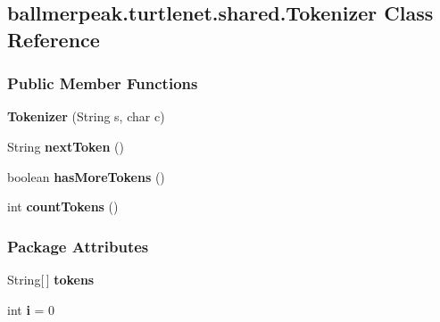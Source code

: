 \hypertarget{classballmerpeak_1_1turtlenet_1_1shared_1_1Tokenizer}{\subsection{ballmerpeak.\-turtlenet.\-shared.\-Tokenizer Class Reference}
\label{classballmerpeak_1_1turtlenet_1_1shared_1_1Tokenizer}
}
\subsubsection*{Public Member Functions}
\begin{DoxyCompactItemize}
\item 
\hypertarget{classballmerpeak_1_1turtlenet_1_1shared_1_1Tokenizer_a5aabdd62ed478d9d0693741b000aed81}{{\bfseries Tokenizer} (String s, char c)}\label{classballmerpeak_1_1turtlenet_1_1shared_1_1Tokenizer_a5aabdd62ed478d9d0693741b000aed81}

\item 
\hypertarget{classballmerpeak_1_1turtlenet_1_1shared_1_1Tokenizer_aaa2e2f9a3abb9557ab3e11e7f7103c3d}{String {\bfseries next\-Token} ()}\label{classballmerpeak_1_1turtlenet_1_1shared_1_1Tokenizer_aaa2e2f9a3abb9557ab3e11e7f7103c3d}

\item 
\hypertarget{classballmerpeak_1_1turtlenet_1_1shared_1_1Tokenizer_a4a3ca279fc748a7afcd37fd50bc533d4}{boolean {\bfseries has\-More\-Tokens} ()}\label{classballmerpeak_1_1turtlenet_1_1shared_1_1Tokenizer_a4a3ca279fc748a7afcd37fd50bc533d4}

\item 
\hypertarget{classballmerpeak_1_1turtlenet_1_1shared_1_1Tokenizer_a9e57ee02e894bf1291ae702ecc0fa11f}{int {\bfseries count\-Tokens} ()}\label{classballmerpeak_1_1turtlenet_1_1shared_1_1Tokenizer_a9e57ee02e894bf1291ae702ecc0fa11f}

\end{DoxyCompactItemize}
\subsubsection*{Package Attributes}
\begin{DoxyCompactItemize}
\item 
\hypertarget{classballmerpeak_1_1turtlenet_1_1shared_1_1Tokenizer_a776a32b36d0990c7008b7ae2084ff178}{String\mbox{[}$\,$\mbox{]} {\bfseries tokens}}\label{classballmerpeak_1_1turtlenet_1_1shared_1_1Tokenizer_a776a32b36d0990c7008b7ae2084ff178}

\item 
\hypertarget{classballmerpeak_1_1turtlenet_1_1shared_1_1Tokenizer_a97d589eb1229875bb10e4ab062a1489a}{int {\bfseries i} = 0}\label{classballmerpeak_1_1turtlenet_1_1shared_1_1Tokenizer_a97d589eb1229875bb10e4ab062a1489a}

\end{DoxyCompactItemize}


